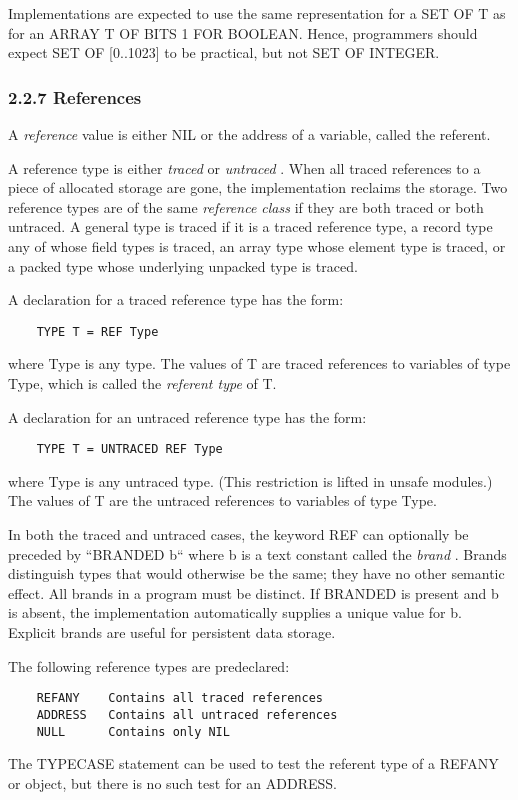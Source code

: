 \documentclass[10pt]{article}
\begin{document}
  Implementations are expected to use the same representation for a SET OF T as for an ARRAY T OF BITS 1 FOR BOOLEAN. Hence, programmers should expect SET OF [0..1023] to be practical, but not SET OF INTEGER. 


 
\subsubsection*{2.2.7 References}


  A \emph{reference}
 value is either NIL or the address of a variable, called the referent. 


 A reference type is either \emph{traced}
 or \emph{untraced}
. When all traced references to a piece of allocated storage are gone, the implementation reclaims the storage. Two reference types are of the same \emph{reference class}
 if they are both traced or both untraced. A general type is traced if it is a traced reference type, a record type any of whose field types is traced, an array type whose element type is traced, or a packed type whose underlying unpacked type is traced. 


 A declaration for a traced reference type has the form: 
\begin{verbatim}
    TYPE T = REF Type
\end{verbatim}
 where Type is any type. The values of T are traced references to variables of type Type, which is called the \emph{referent type}
 of T. 


 A declaration for an untraced reference type has the form: 
\begin{verbatim}
    TYPE T = UNTRACED REF Type
\end{verbatim}
 where Type is any untraced type. (This restriction is lifted in unsafe modules.) The values of T are the untraced references to variables of type Type. 


 In both the traced and untraced cases, the keyword REF can optionally be preceded by ``BRANDED b`` where b is a text constant called the \emph{brand}
. Brands distinguish types that would otherwise be the same; they have no other semantic effect. All brands in a program must be distinct. If BRANDED is present and b is absent, the implementation automatically supplies a unique value for b. Explicit brands are useful for persistent data storage. 


 The following reference types are predeclared: 
\begin{verbatim}
    REFANY    Contains all traced references
    ADDRESS   Contains all untraced references
    NULL      Contains only NIL
\end{verbatim}
 The TYPECASE statement can be used to test the referent type of a REFANY or object, but there is no such test for an ADDRESS. 
\end{document}
